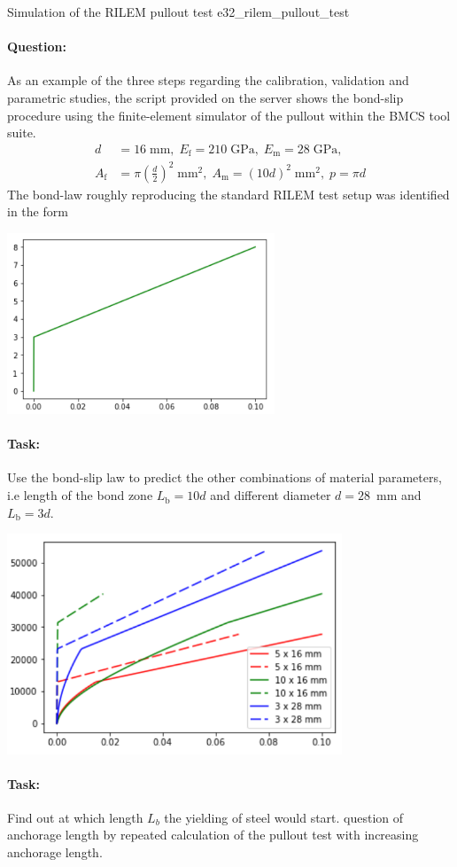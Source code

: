 \documentclass[main.tex]{subfiles}
\begin{document}
\begin{bmcsex}{Simulation of the RILEM pullout test}
{e32_rilem_pullout_test}
\paragraph{Question:} As an example of the three steps regarding the calibration, validation and parametric studies, 
the script provided on the server shows the bond-slip procedure using the finite-element simulator of the pullout within the BMCS tool suite. 
\begin{align}
\nonumber
d &= 16\;\mathrm{mm}, \;
E_\mathrm{f} = 210\;\mathrm{GPa}, \;
E_\mathrm{m} = 28\;\mathrm{GPa}, \\
\nonumber
A_\mathrm{f} &= \pi (\frac{d}{2})^2\;\mathrm{mm}^2, \; A_\mathrm{m} = (10d)^2 \;\mathrm{mm}^2, \;
p = \pi d
\end{align}
The bond-law roughly reproducing the standard RILEM test setup was identified in the form
\begin{center}
\includegraphics[width=8cm]{fig/Lecture03/bond_slip_rilem_test.png}\\
\end{center}
\paragraph{Task:} Use the bond-slip law to predict the other combinations of material parameters, i.e length of the bond zone $L_\mathrm{b} = 10d$ and different diameter $d = 28$~mm and $L_\mathrm{b} = 3d$.
\begin{center}
\includegraphics[width=10cm]{fig/Lecture03/pullout_rilem_test.png}
\end{center}
\paragraph{Task:}
Find out at which length $L_b$ the yielding of steel would start. question of anchorage length by repeated calculation of the pullout test with increasing anchorage length.
\end{bmcsex}
\end{document}
